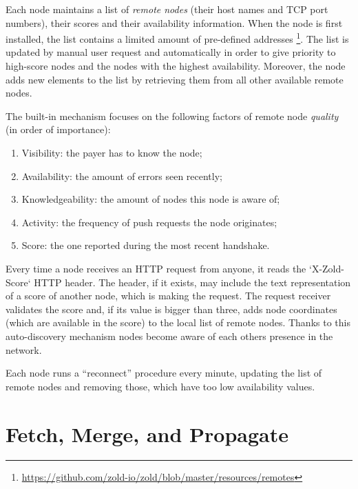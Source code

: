 \documentclass[11pt,oneside]{article}
\begin{document}
Each node maintains a list of \emph{remote nodes} (their host names and TCP port numbers),
their scores and their availability information. When the node is first installed,
the list contains a limited amount of pre-defined addresses%
\footnote{\url{https://github.com/zold-io/zold/blob/master/resources/remotes}}.
The list is updated by manual user request and automatically in order to give priority
to high-score nodes and the nodes with the highest availability.
Moreover, the node adds new elements to the list by retrieving them from all other
available remote nodes.

The built-in mechanism focuses on the following factors of
remote node \emph{quality} (in order of importance):

\begin{enumerate}
  \item Visibility: the payer has to know the node;
  \item Availability: the amount of errors seen recently;
  \item Knowledgeability: the amount of nodes this node is aware of;
  \item Activity: the frequency of push requests the node originates;
  \item Score: the one reported during the most recent handshake.
\end{enumerate}

Every time a node receives an HTTP request from anyone, it reads the
`X-Zold-Score` HTTP header. The header, if it exists, may include
the text representation of a score of another node, which is making
the request. The request receiver validates the score and, if its
value is bigger than three, adds node coordinates (which are
available in the score) to the local list of remote nodes. Thanks to this
auto-discovery mechanism nodes become aware of each others presence
in the network.

Each node runs a ``reconnect'' procedure every minute, updating the list
of remote nodes and removing those, which have too low availability values.

\section{Fetch, Merge, and Propagate}\label{sec:fetch}
\end{document}
